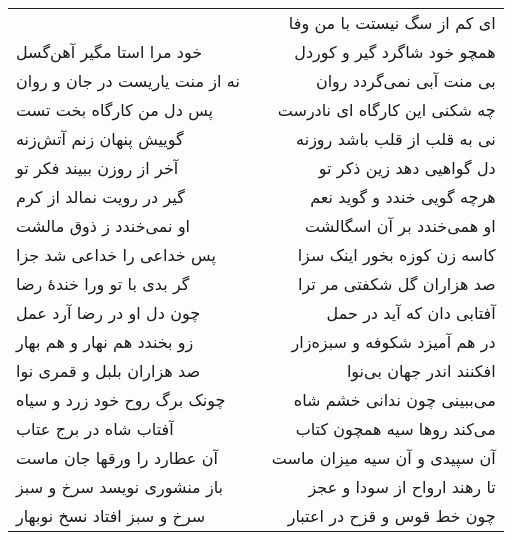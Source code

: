 \begin{center}
\begin{longtable}{l p{0.5cm} r}
&&
ای کم از سگ نیستت با من وفا
\\
خود مرا استا مگیر آهن‌گسل
&&
همچو خود شاگرد گیر و کوردل
\\
نه از منت یاریست در جان و روان
&&
بی منت آبی نمی‌گردد روان
\\
پس دل من کارگاه بخت تست
&&
چه شکنی این کارگاه ای نادرست
\\
گوییش پنهان زنم آتش‌زنه
&&
نی به قلب از قلب باشد روزنه
\\
آخر از روزن ببیند فکر تو
&&
دل گواهیی دهد زین ذکر تو
\\
گیر در رویت نمالد از کرم
&&
هرچه گویی خندد و گوید نعم
\\
او نمی‌خندد ز ذوق مالشت
&&
او همی‌خندد بر آن اسگالشت
\\
پس خداعی را خداعی شد جزا
&&
کاسه زن کوزه بخور اینک سزا
\\
گر بدی با تو ورا خندهٔ رضا
&&
صد هزاران گل شکفتی مر ترا
\\
چون دل او در رضا آرد عمل
&&
آفتابی دان که آید در حمل
\\
زو بخندد هم نهار و هم بهار
&&
در هم آمیزد شکوفه و سبزه‌زار
\\
صد هزاران بلبل و قمری نوا
&&
افکنند اندر جهان بی‌نوا
\\
چونک برگ روح خود زرد و سیاه
&&
می‌ببینی چون ندانی خشم شاه
\\
آفتاب شاه در برج عتاب
&&
می‌کند روها سیه همچون کتاب
\\
آن عطارد را ورقها جان ماست
&&
آن سپیدی و آن سیه میزان ماست
\\
باز منشوری نویسد سرخ و سبز
&&
تا رهند ارواح از سودا و عجز
\\
سرخ و سبز افتاد نسخ نوبهار
&&
چون خط قوس و قزح در اعتبار
\\
\end{longtable}
\end{center}
